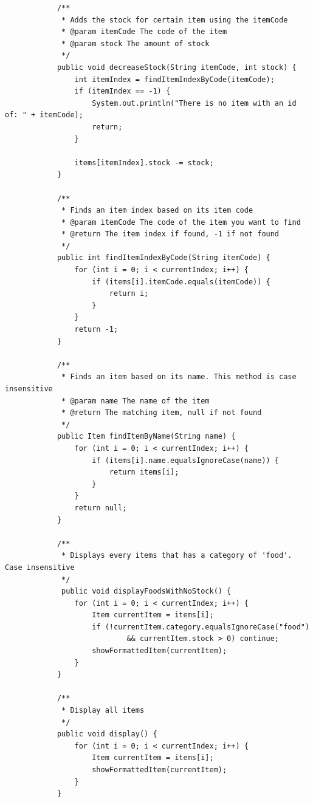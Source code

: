 \documentclass[12pt,titlepage]{article}
\begin{document}
\begin{enumerate}
{\begin{verbatim}
            /**
             * Adds the stock for certain item using the itemCode
             * @param itemCode The code of the item
             * @param stock The amount of stock
             */
            public void decreaseStock(String itemCode, int stock) {
                int itemIndex = findItemIndexByCode(itemCode);
                if (itemIndex == -1) {
                    System.out.println("There is no item with an id of: " + itemCode);
                    return;
                }

                items[itemIndex].stock -= stock;
            }

            /**
             * Finds an item index based on its item code
             * @param itemCode The code of the item you want to find
             * @return The item index if found, -1 if not found
             */
            public int findItemIndexByCode(String itemCode) {
                for (int i = 0; i < currentIndex; i++) {
                    if (items[i].itemCode.equals(itemCode)) {
                        return i;
                    }
                }
                return -1;
            }

            /**
             * Finds an item based on its name. This method is case insensitive
             * @param name The name of the item
             * @return The matching item, null if not found
             */
            public Item findItemByName(String name) {
                for (int i = 0; i < currentIndex; i++) {
                    if (items[i].name.equalsIgnoreCase(name)) {
                        return items[i];
                    }
                }
                return null;
            }

            /**
             * Displays every items that has a category of 'food'. Case insensitive
             */
             public void displayFoodsWithNoStock() {
                for (int i = 0; i < currentIndex; i++) {
                    Item currentItem = items[i];
                    if (!currentItem.category.equalsIgnoreCase("food")
                            && currentItem.stock > 0) continue;
                    showFormattedItem(currentItem);
                }
            }

            /**
             * Display all items
             */
            public void display() {
                for (int i = 0; i < currentIndex; i++) {
                    Item currentItem = items[i];
                    showFormattedItem(currentItem);
                }
            }


\end{verbatim}}
\end{enumerate}
\end{document}
